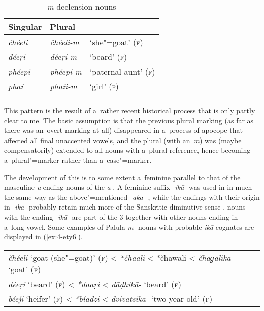 \begin{table}[ht]
\caption{\textit{m}-{declension} nouns}
\begin{tabularx}{.75\textwidth}{ Q Q l }
\lsptoprule
Singular &
Plural &
\\\midrule
\textit{čhéeli } &
\textit{čhéeli-m} &
`she"=goat' (\textsc{f})\\
\textit{déeṛi} &
\textit{déeṛi-m} &
`beard' (\textsc{f})\\
\textit{phéepi} &
\textit{phéepi-m} &
`paternal aunt' (\textsc{f})\\
\textit{phaí} &
\textit{phaíi-m} &
`girl' (\textsc{f})\\\lspbottomrule
\end{tabularx}
\label{tab:4-16}
\end{table}


This pattern is the result of a~rather recent historical process that is only partly clear to me. The basic assumption is that the previous plural marking (as far as there was an~overt marking at all) disappeared in a~process of apocope that affected all final unaccented vowels, and the plural  (with an~\textit{m}) was (maybe compensatorily) extended to all nouns with a~plural reference, hence becoming a~plural"=marker rather than a~case"=marker.


The development of this  is to some extent a~feminine parallel to that of the masculine \textit{u}-ending nouns of the \textit{a}-. A feminine  suffix \textit{-ikā-} was used in \iliOIA in much the same way as the above"=mentioned \textit{-aka-} \citep[1222]{whitney1960}, while the \iliNIA endings with their origin in \textit{-ikā-} probably retain much more of the Sanskritic diminutive sense \citep[222]{masica1991}. \iliOIA nouns with the ending \textit{-ikā-} are part of the \iliOIA {} 3 together with other nouns ending in a~long vowel. Some examples of Palula \textit{m}- nouns with probable \iliOIA \textit{ikā}-cognates are displayed in (\ref{ex:4-ety6}). 


\begin{exe}
\extab
\label{ex:4-ety6}
\begin{tabular}{ l }
\textit{čhéeli} `goat (she"=goat)' (\textsc{f}) {\textless} \textit{*čhaali} {\textless} *čhawali {\textless} \textit{čhaɡalikā-} `goat' (\textsc{f})\\
\textit{déeṛi} `beard' (\textsc{f}) {\textless} \textit{*daaṛi} {\textless} \textit{dāḍhikā-} `beard' (\textsc{f})\\
\textit{béeǰi} `heifer' (\textsc{f}) {\textless} \textit{*bíadzi} {\textless} \textit{dvivatsikā-} `two year old' (\textsc{f})
\end{tabular}
\end{exe}


